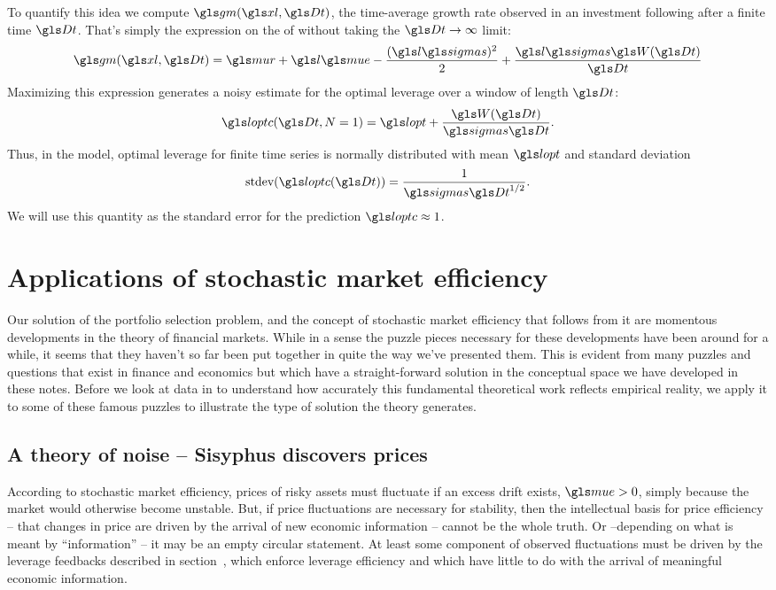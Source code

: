 To quantify this idea we compute $\gm(\xl,\Dt)$, \ie the time-average growth rate observed in an investment following  after a finite
time $\Dt$. That's simply the expression on the \RHS of  without taking the $\Dt\to\infty$ limit:
\begin{equation}
\gm(\xl,\Dt) =
\mur + \l\mue - \frac{(\l\sigmas)^2}{2} + \frac{\l\sigmas \gW(\Dt)}{\Dt}
%
\elabel{g_l_finite}
\end{equation}
Maximizing this expression generates a noisy estimate for the optimal leverage over a window of length $\Dt$:
\begin{equation}
\loptc(\Dt, N=1) = \lopt + \frac{\gW(\Dt)}{\sigmas \Dt}.
\end{equation}
Thus, in the model, optimal leverage for finite time series is
normally distributed with mean $\lopt$ and standard deviation
\begin{equation}
\text{stdev}(\loptc(\Dt)) = \frac{1}{\sigmas \Dt^{1/2}}.
\elabel{variance}
\end{equation}
We will use this quantity as the standard error for the prediction $\loptc\approx1$. 


\section{Applications of stochastic market efficiency}
Our solution of the portfolio selection problem, and the concept of stochastic market efficiency that follows from it are momentous developments in the theory of financial markets. While in a sense the puzzle pieces necessary for these developments have been around for a while, it seems that they haven't so far been put together in quite the way we've presented them. This is evident from many puzzles and questions that exist in finance and economics but which have a straight-forward solution in the conceptual space we have developed in these notes. Before we look at data in  to understand how accurately this fundamental theoretical work reflects empirical reality, we apply it to some of these famous puzzles to illustrate the type of solution the theory generates.

\subsection{A theory of noise -- Sisyphus discovers prices}
According to stochastic market efficiency, prices of risky assets must fluctuate if an excess drift exists, $\mue>0$, simply because the market would otherwise become unstable. But, if price fluctuations are necessary for stability, then the intellectual basis for price efficiency -- that changes in price are driven by the arrival of new economic information --  cannot be the whole truth. Or  --depending on what is meant by ``information'' -- it may be an empty circular statement. At least some component of observed fluctuations must be driven by the leverage feedbacks described in section~, which enforce leverage efficiency and which have little to do with the arrival of meaningful economic information.

